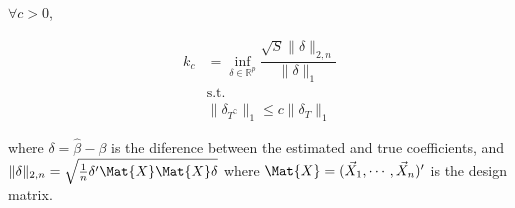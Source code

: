 \begin{Def}
$\forall c > 0$,

\begin{align*}
k_c &= \inf_{\delta \in \mathbb{R}^p}{
    \dfrac{\sqrt{S} \|\delta\|_{2, n}}{\|\delta\|_1}
}\\
&\text{s.t.}\\
&\|\delta_{T^{\complement}}\|_1 \leq c \|\delta_T\|_1
\end{align*}

where $\delta = \hat{\beta} - \beta$ is the diference between the estimated and true coefficients, and $\|\delta\|_{2, n} = \sqrt{\frac{1}{n} \delta'\Mat{X}\Mat{X}\delta}$ where $\Mat{X} = (\Vec{X}_1, \cdots, \Vec{X}_n)'$ is the design matrix.
\end{Def}

